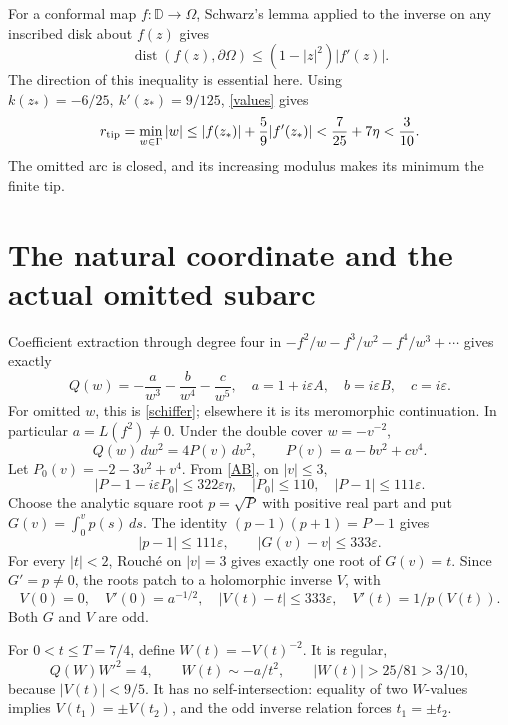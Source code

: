 \documentclass[10pt]{article}
\newcommand{\eps}{\varepsilon}
\newcommand{\D}{\mathbb D}
\begin{document}
For a conformal map \(f:\D\to\Omega\), Schwarz's lemma applied to the
inverse on any inscribed disk about \(f(z)\) gives
\[
          \operatorname{dist}(f(z),\partial\Omega)
          \le(1-|z|^2)|f'(z)|.
\]
The direction of this inequality is essential here.
Using \(k(z_*)=-6/25,\ k'(z_*)=9/125\), \eqref{values} gives
\begin{equation}\label{tip}
 r_{\rm tip}=\min_{w\in\Gamma}|w|
 \le |f(z_*)|+\frac59|f'(z_*)|
 <\frac7{25}+7\eta<\frac3{10}.
\end{equation}
The omitted arc is closed, and its increasing modulus makes its
minimum the finite tip.

\section{The natural coordinate and the actual omitted subarc}
Coefficient extraction through degree four in
\(-f^2/w-f^3/w^2-f^4/w^3+\cdots\) gives exactly
\begin{equation}\label{Q}
 Q(w)=-\frac a{w^3}-\frac b{w^4}-\frac c{w^5},
 \quad a=1+i\eps A,\quad b=i\eps B,\quad c=i\eps .
\end{equation}
For omitted \(w\), this is \eqref{schiffer}; elsewhere it is its
meromorphic continuation. In particular \(a=L(f^2)\ne0\).
Under the double cover \(w=-v^{-2}\),
\[
 Q(w)\,dw^2=4P(v)\,dv^2,\qquad P(v)=a-bv^2+cv^4.
\]
Let \(P_0(v)=-2-3v^2+v^4\). From \eqref{AB}, on \(|v|\le3\),
\begin{equation}\label{P}
 |P-1-i\eps P_0|\le322\eps\eta,\quad
 |P_0|\le110,\quad |P-1|\le111\eps .
\end{equation}
Choose the analytic square root \(p=\sqrt P\) with positive real part
and put \(G(v)=\int_0^v p(s)\,ds\).
The identity \((p-1)(p+1)=P-1\) gives
\[
                 |p-1|\le111\eps,\qquad |G(v)-v|\le333\eps.
\]
For every \(|t|<2\), Rouché on \(|v|=3\) gives exactly one root
of \(G(v)=t\). Since \(G'=p\ne0\), the roots patch to a holomorphic
inverse \(V\), with
\begin{equation}\label{V}
 V(0)=0,\quad V'(0)=a^{-1/2},\quad
 |V(t)-t|\le333\eps,\quad V'(t)=1/p(V(t)).
\end{equation}
Both \(G\) and \(V\) are odd.

For \(0<t\le T=7/4\), define \(W(t)=-V(t)^{-2}\). It is regular,
\begin{equation}\label{W}
 Q(W)W'^2=4,\qquad W(t)\sim-a/t^2,\qquad
 |W(t)|>25/81>3/10,
\end{equation}
because \(|V(t)|<9/5\).
It has no self-intersection: equality of two \(W\)-values implies
\(V(t_1)=\pm V(t_2)\), and the odd inverse relation forces
\(t_1=\pm t_2\).
\end{document}
